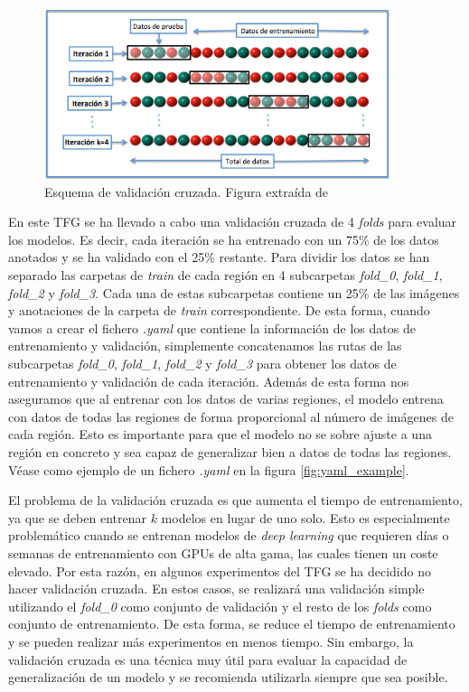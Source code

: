 \begin{figure}[H]
    \centering
    \includegraphics[width=0.9\textwidth]{img/K-fold_cross_validation.jpg}
    \caption{Esquema de validación cruzada. Figura extraída de \cite{KFoldCV_image}}
    \label{fig:cross_validation}
\end{figure}

En este TFG se ha llevado a cabo una validación cruzada de 4 \textit{folds} para evaluar los modelos. Es decir, cada iteración se ha entrenado con un 75\% de los datos anotados y se ha validado con el 25\% restante. Para dividir los datos se han separado las carpetas de \textit{train} de cada región en 4 subcarpetas \textit{fold\_0}, \textit{fold\_1}, \textit{fold\_2} y \textit{fold\_3}. Cada una de estas subcarpetas contiene un 25\% de las imágenes y anotaciones de la carpeta de \textit{train} correspondiente. De esta forma, cuando vamos a crear el fichero \textit{.yaml} que contiene la información de los datos de entrenamiento y validación, simplemente concatenamos las rutas de las subcarpetas \textit{fold\_0}, \textit{fold\_1}, \textit{fold\_2} y \textit{fold\_3} para obtener los datos de entrenamiento y validación de cada iteración. Además de esta forma nos aseguramos que al entrenar con los datos de varias regiones, el modelo entrena con datos de todas las regiones de forma proporcional al número de imágenes de cada región. Esto es importante para que el modelo no se sobre ajuste a una región en concreto y sea capaz de generalizar bien a datos de todas las regiones. Véase como ejemplo de un fichero \textit{.yaml} en la figura \ref{fig:yaml_example}.

El problema de la validación cruzada es que aumenta el tiempo de entrenamiento, ya que se deben entrenar $k$ modelos en lugar de uno solo. Esto es especialmente problemático cuando se entrenan modelos de \textit{deep learning} que requieren días o semanas de entrenamiento con GPUs de alta gama, las cuales tienen un coste elevado. Por esta razón, en algunos experimentos del TFG se ha decidido no hacer validación cruzada. En estos casos, se realizará una validación simple utilizando el \textit{fold\_0} como conjunto de validación y el resto de los \textit{folds} como conjunto de entrenamiento. De esta forma, se reduce el tiempo de entrenamiento y se pueden realizar más experimentos en menos tiempo. Sin embargo, la validación cruzada es una técnica muy útil para evaluar la capacidad de generalización de un modelo y se recomienda utilizarla siempre que sea posible.

